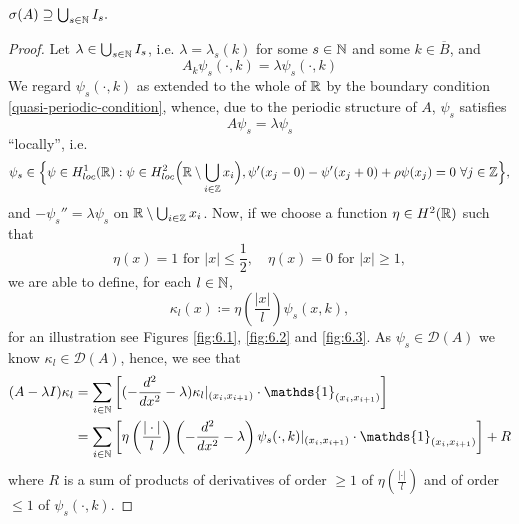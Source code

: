 \begin{theorem} \label{4.1:thm-MainResult.FirstInclusion}
	$\sigma(A) \supseteq \bigcup_{s \in \mathbb{N}} I_{s}.$
	
	\begin{proof}
		Let $\lambda \in \bigcup_{s \in \mathbb{N}} I_{s}$, i.e. $\lambda = \lambda_{s}(k)$ for some $s \in \mathbb{N}$ and some $k \in \overline{B}$, and 
		\begin{equation}
			A_{k} \psi_{s}(\cdot, k) = \lambda \psi_{s}(\cdot, k) \label{firstinclusion-firstequation} 
		\end{equation} 
		We regard $\psi_{s}(\cdot, k)$ as extended to the whole of $\mathbb{R}$ by the boundary condition \eqref{quasi-periodic-condition}, whence, due to the periodic structure of $A$, $\psi_{s}$ satisfies
		\[ A \psi_{s} = \lambda \psi_{s} \]
		\enquote{locally}, i.e. 
		\[ \psi_{s} \in \Big\{ \psi \in  H^{1}_{loc}(\mathbb{R}) : \psi \in H^{2}_{loc}\Big(\mathbb{R} \setminus \bigcup_{i \in \mathbb{Z}} x_{i} \Big), \psi'(x_{j} - 0) - \psi'(x_{j} + 0) + \rho  \psi(x_{j}) = 0 ~\forall j \in \mathbb{Z} \Big\}, \]
		and $ -\psi_{s}'' = \lambda \psi_{s}$ on $\mathbb{R} \setminus \bigcup_{i \in \mathbb{Z}} x_{i}$. Now, if we choose a function $\eta \in H^{2}(\mathbb{R})$ such that 
			\begin{equation}
				\eta(x) = 1 \text{ for } |x| \leq \frac{1}{2}, \quad \eta(x) = 0 \text{ for } |x| \geq 1, \label{eta}
			\end{equation} 
		we are able to define, for each $l \in \mathbb{N}$,
			\[ \kappa_{l}(x) \coloneqq \eta\left(\frac{|x|}{l}\right) \psi_{s}(x, k), \]		
	 	for an illustration see Figures \ref{fig:6.1}, \ref{fig:6.2} and \ref{fig:6.3}. As $\psi_{s} \in \mathcal{D}(A)$ we know $\kappa_{l} \in \mathcal{D}(A)$, hence, we see that
		\begin{align}
			(A - \lambda I) \kappa_{l} & = \sum_{i \in \N} \left[ (- \frac{d^{2}}{dx^{2}} - \lambda) \kappa_{l}|_{(x_{i}, x_{i+1})} \cdot \mathds{1}_{(x_{i}, x_{i+1})} \right] \label{eq:sepofspectraleq} \\
				& = \sum_{i \in \N} \left[ \eta\left(\frac{|\cdot|}{l}\right) \left(- \frac{d^{2}}{dx^{2}} - \lambda \right) \psi_{s}(\cdot, k) |_{(x_{i}, x_{i+1})} \cdot \mathds{1}_{(x_{i}, x_{i+1})} \right] + R \notag
		\end{align}
		where $R$ is a sum of products of derivatives of order $\geq 1$ of $\eta\left(\frac{|\cdot|}{l}\right)$ and of order $\leq 1$ of $\psi_{s}(\cdot, k)$. 
		

\end{proof}
\end{theorem}
